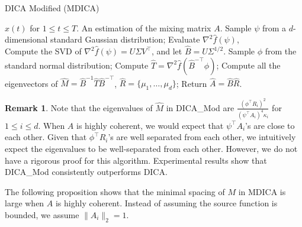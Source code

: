 \documentclass[jmlr]{article}
\theoremstyle{definition}
\newtheorem{remark}[lemma]{Remark}
\begin{document}
\begin{algorithm} 
\caption{DICA Modified (MDICA)}
\label{alg:DICA_Mod}
\begin{algorithmic}[1]
\INPUT $x(t)$ for $1\le t \le T$. 
\OUTPUT An estimation of the mixing matrix $A$. 
\STATE Sample $\psi$ from a $d$-dimensional standard Gaussian distribution;
\STATE Evaluate $\nabla^2\hat{f}(\psi)$, \\
\STATE Compute the SVD of $\nabla^2\hat{f}(\psi) = U \Sigma V^{\top}$, and let $\hat{B} =  U \Sigma^{1/2}$.
\STATE Sample $\phi$ from the standard normal distribution;
\STATE Compute $\hat{T} = \nabla^2 \hat{f}(\hat{B}^{-\top}\phi)$;
\STATE Compute all the eigenvectors of $\hat{M} = \hat{B}^{-1}\hat{T}\hat{B}^{-\top}$, $\hat{R} = \{\mu_1,\ldots,\mu_d\}$;
\STATE Return $\hat{A} = \hat{B}\hat{R}$.
\end{algorithmic}
\end{algorithm}
\begin{remark}
\label{rmk:DICA_Mod}
Note that the eigenvalues of $\hat{M}$ in DICA\_Mod are $\frac{(\phi^{\top}R_i)^2}{(\psi^{\top}A_i)^4\kappa_i}$ for $1\le i\le d$. 
When $A$ is highly coherent, we would expect that $\psi^{\top}A_i$'s are close to each other. 
Given that $\phi^{\top}R_i$'s are well separated from each other, we intuitively expect the eigenvalues to be well-separated from each other. 
However, we do not have a rigorous proof for this algorithm.
Experimental results show that DICA\_Mod consistently outperforms DICA. 

\end{remark}
The following proposition shows that the minimal spacing of $M$ in MDICA is large when $A$ is highly coherent. Instead of assuming the source function is bounded, we assume $\|A_i\|_2 = 1$.
\end{document}
